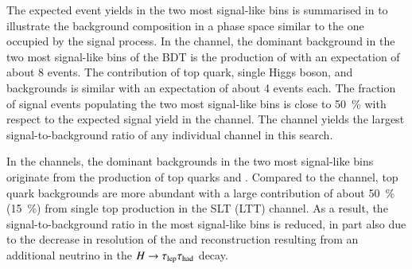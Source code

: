 The expected event yields in the two most signal-like bins is summarised in
 to illustrate the background
composition in a phase space similar to the one occupied by the signal process.
In the \hadhad channel, the dominant background in the two most signal-like bins
of the BDT is the production of \ZHF with an expectation of about 8 events. The
contribution of top quark, single Higgs boson, and \faketauhadvis backgrounds is
similar with an expectation of about 4 events each. The fraction of signal
events populating the two most signal-like bins is close to \SI{50}{\percent}
with respect to the expected signal yield in the channel. The \hadhad channel
yields the largest signal-to-background ratio of any individual channel in this
search.

In the \lephad channels, the dominant backgrounds in the two most signal-like
bins originate from the production of top quarks and \ZHF. Compared to the
\hadhad channel, top quark backgrounds are more abundant
with a large contribution of about \SI{50}{\percent} (\SI{15}{\percent}) from
single top production in the SLT (LTT) channel. As a result, the
signal-to-background ratio in the most signal-like bins is reduced, in part also
due to the decrease in resolution of the \mMMC and \mHH reconstruction resulting
from an additional neutrino in the $H \to \tau_{\text{lep}}\tau_{\text{had}}$ decay.


